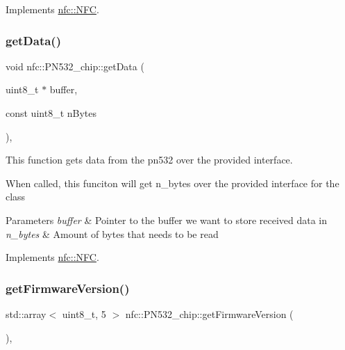 Implements \hyperlink{classnfc_1_1NFC_a72523a6c0afdb3f695a64e46fd6d2213}{nfc\+::\+N\+FC}.

\mbox{\label{classnfc_1_1PN532__chip_ae8414552a504fec6b62ad0be140e53e0}} 
\subsubsection{\texorpdfstring{get\+Data()}{getData()}}
{\footnotesize\ttfamily void nfc\+::\+P\+N532\+\_\+chip\+::get\+Data (\begin{DoxyParamCaption}\item[{uint8\+\_\+t $\ast$}]{buffer,  }\item[{const uint8\+\_\+t}]{n\+Bytes }\end{DoxyParamCaption})\hspace{0.3cm}{\ttfamily [override]}, {\ttfamily [virtual]}}



This function gets data from the pn532 over the provided interface. 

When called, this funciton will get n\+\_\+bytes over the provided interface for the class 
\begin{DoxyParams}{Parameters}
{\em buffer} & Pointer to the buffer we want to store received data in \\
\hline
{\em n\+\_\+bytes} & Amount of bytes that needs to be read \\
\hline
\end{DoxyParams}


Implements \hyperlink{classnfc_1_1NFC_a3458fc807a5f0d485099a1e5f54bcbb5}{nfc\+::\+N\+FC}.

\mbox{\label{classnfc_1_1PN532__chip_a00764b6b9472c89430bb1503ec1bf08b}} 
\subsubsection{\texorpdfstring{get\+Firmware\+Version()}{getFirmwareVersion()}}
{\footnotesize\ttfamily std\+::array$<$ uint8\+\_\+t, 5 $>$ nfc\+::\+P\+N532\+\_\+chip\+::get\+Firmware\+Version (\begin{DoxyParamCaption}{ }\end{DoxyParamCaption})\hspace{0.3cm}{\ttfamily [override]}, {\ttfamily [virtual]}}



